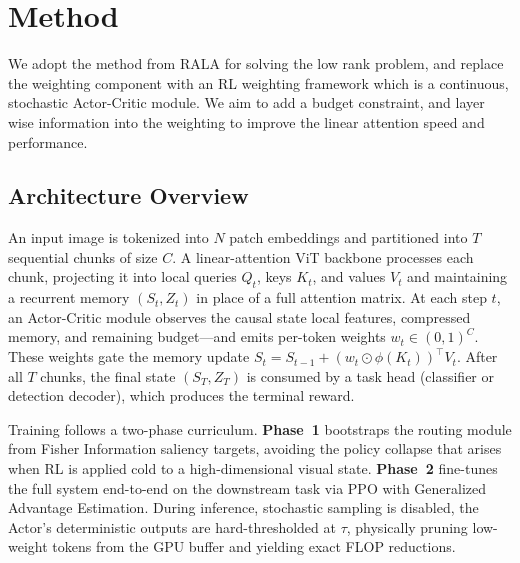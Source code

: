 \section{Method}
We adopt the method from RALA for solving the low rank problem, and replace the weighting component with an RL weighting framework which is a continuous, stochastic Actor-Critic module. We aim to add a budget constraint, and layer wise information into the weighting to improve the linear attention speed and performance. 
\subsection{Architecture Overview} 
An input image is tokenized into $N$ patch embeddings and partitioned into $T$ sequential chunks of size $C$. A linear-attention ViT backbone processes each chunk, projecting it into local queries $Q_t$, keys $K_t$, and values $V_t$ and maintaining a recurrent memory $(S_t, Z_t)$ in place of a full attention matrix. At each step $t$, an Actor-Critic module observes the causal state local features, compressed memory, and remaining budget—and emits per-token weights $w_t \in (0,1)^C$. These weights gate the memory update $S_t = S_{t-1} + (w_t \odot \phi(K_t))^\top V_t$. After all $T$ chunks, the final state $(S_T, Z_T)$ is consumed by a task head (classifier or detection decoder), which produces the terminal reward.
 
Training follows a two-phase curriculum. \textbf{Phase~1} bootstraps the routing module from Fisher Information saliency targets, avoiding the policy collapse that arises when RL is applied cold to a high-dimensional visual state. \textbf{Phase~2} fine-tunes the full system end-to-end on the downstream task via PPO with Generalized Advantage Estimation. During inference,  stochastic sampling is disabled, the Actor's deterministic outputs are hard-thresholded at $\tau$, physically pruning low-weight tokens from the GPU buffer and yielding exact FLOP reductions.

